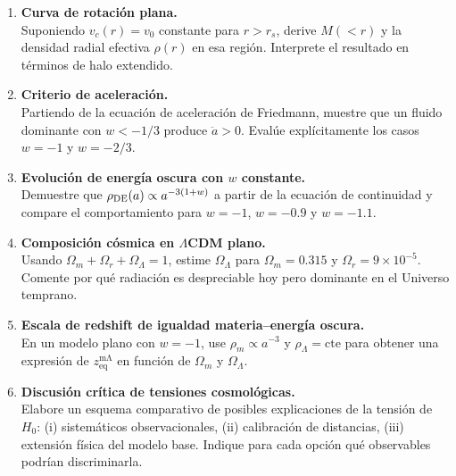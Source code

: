 \begin{enumerate}[leftmargin=2.2em, label=\textbf{P\arabic*.}]

\item \textbf{Curva de rotación plana.} \\
Suponiendo $v_c(r)=v_0$ constante para $r>r_s$, derive $M(<r)$ y la densidad radial efectiva $\rho(r)$ en esa región. Interprete el resultado en términos de halo extendido.

\item \textbf{Criterio de aceleración.} \\
Partiendo de la ecuación de aceleración de Friedmann, muestre que un fluido dominante con $w<-1/3$ produce $\ddot a>0$. Evalúe explícitamente los casos $w=-1$ y $w=-2/3$.

\item \textbf{Evolución de energía oscura con $w$ constante.} \\
Demuestre que $\rho_{\rm DE}(a)\propto a^{-3(1+w)}$ a partir de la ecuación de continuidad y compare el comportamiento para $w=-1$, $w=-0.9$ y $w=-1.1$.

\item \textbf{Composición cósmica en $\Lambda$CDM plano.} \\
Usando $\Omega_m+\Omega_r+\Omega_\Lambda=1$, estime $\Omega_\Lambda$ para $\Omega_m=0.315$ y $\Omega_r=9\times10^{-5}$. Comente por qué radiación es despreciable hoy pero dominante en el Universo temprano.

\item \textbf{Escala de redshift de igualdad materia--energía oscura.} \\
En un modelo plano con $w=-1$, use $\rho_m\propto a^{-3}$ y $\rho_\Lambda=\text{cte}$ para obtener una expresión de $z_{\mathrm{eq}}^{\mathrm{m\Lambda}}$ en función de $\Omega_m$ y $\Omega_\Lambda$.

\item \textbf{Discusión crítica de tensiones cosmológicas.} \\
Elabore un esquema comparativo de posibles explicaciones de la tensión de $H_0$: (i) sistemáticos observacionales, (ii) calibración de distancias, (iii) extensión física del modelo base. Indique para cada opción qué observables podrían discriminarla.

\end{enumerate}
